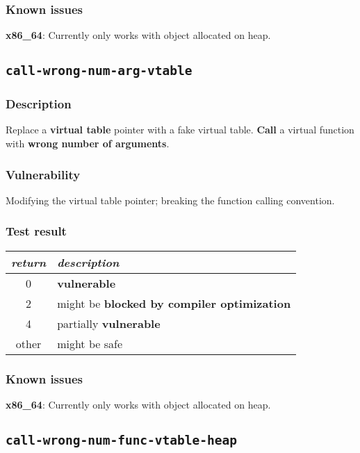 \documentclass[a4paper]{book}
\begin{document}
\subsubsection{Known issues}

\textbf{x86\_64}: Currently only works with object allocated on heap.

\newpage
\subsection{\texttt{call-wrong-num-arg-vtable}}\label{test-call-wrong-num-arg-vtable}

\subsubsection{Description}
Replace a \textbf{virtual table} pointer with a fake virtual table.
\textbf{Call} a virtual function with \textbf{wrong number of arguments}.

\subsubsection{Vulnerability}
Modifying the virtual table pointer; breaking the function calling convention.

\subsubsection{Test result}
\begin{tabular}{cl}
  \toprule
  \emph{return}  & \emph{description} \\
  \midrule
  0              & \textbf{vulnerable} \\
  2              & might be \textbf{blocked by compiler optimization} \\
  4              & partially \textbf{vulnerable} \\
  other          & might be safe \\
  \bottomrule
\end{tabular}

\subsubsection{Known issues}

\textbf{x86\_64}: Currently only works with object allocated on heap.

\newpage
\subsection{\texttt{call-wrong-num-func-vtable-heap}}\label{test-call-wrong-num-func-vtable-heap}
\end{document}

